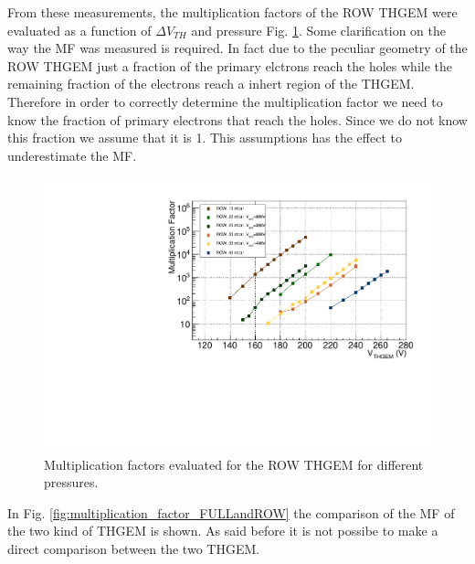 \documentclass[a4paper, 11 pt]{report}
\newcommand{\Vthgem}{$\Delta V_{TH}$}
\begin{document}
From these measurements, the multiplication factors of the ROW THGEM were evaluated as a function 
of \Vthgem{} and pressure Fig. \ref{fig:multiplication_factor_ROW}. Some clarification on the 
way the MF was measured is required. 
In fact due to the peculiar geometry of the ROW THGEM just a fraction of the primary elctrons
reach the holes while the remaining fraction of the electrons reach a inhert region of the 
THGEM. Therefore in order to correctly determine the multiplication factor we need to know the 
fraction of primary electrons that reach the holes.
Since we do not know this fraction we assume that it is 1. This assumptions has the effect 
to underestimate the MF.
\begin{figure}[!t]
	\centering
	\includegraphics[width=\textwidth]{Immagini/MF_ROW_THGEM_noBeam.pdf}
	\caption{Multiplication factors evaluated for the ROW THGEM for different pressures.}
	\label{fig:multiplication_factor_ROW}
\end{figure}
In Fig. \ref{fig:multiplication_factor_FULLandROW} the comparison of the MF of the
two kind of THGEM is shown. As said before it is not possibe to make a direct
comparison between the two THGEM.
\end{document}
